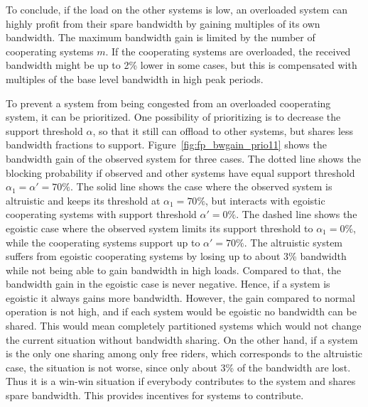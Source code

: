 To conclude, if the load on the other systems is low, an overloaded system can highly profit from their spare bandwidth by gaining multiples of its own bandwidth. The maximum bandwidth gain is limited by the number of cooperating systems $m$.
If the cooperating systems are overloaded, the received bandwidth might be up to 2\% lower in some cases, but this is compensated with multiples of the base level bandwidth in high peak periods.


To prevent a system from being congested from an overloaded cooperating system, it can be prioritized. One possibility of prioritizing is to decrease the support threshold $\alpha$, so that it still can offload to other systems, but shares less bandwidth fractions to support. Figure~\ref{fig:fp_bwgain_prio11} shows the bandwidth gain of the observed system for three cases. The dotted line shows the blocking probability if observed and other systems have equal support threshold $\alpha_1=\alpha'=70\%$. The solid line shows the case where the observed system is altruistic and keeps its threshold at $\alpha_1=70\%$, but interacts with egoistic cooperating systems with support threshold $\alpha'=0\%$. The dashed line shows the egoistic case where the observed system limits its support threshold to $\alpha_1=0\%$, while the cooperating systems support up to $\alpha'=70\%$. The altruistic system suffers from egoistic cooperating systems by losing up to about 3\% bandwidth while not being able to gain bandwidth in high loads. Compared to that, the bandwidth gain in the egoistic case is never negative.
Hence, if a system is egoistic it always gains more bandwidth. However, the gain compared to normal operation is not high, and if each system would be egoistic no bandwidth can be shared. This would mean completely partitioned systems which would not change the current situation without bandwidth sharing.
On the other hand, if a system is the only one sharing among only free riders, which corresponds to the altruistic case, the situation is not worse, since only about 3\% of the bandwidth are lost.
Thus it is a win-win situation if everybody contributes to the system and shares spare bandwidth.
This provides incentives for systems to contribute.

